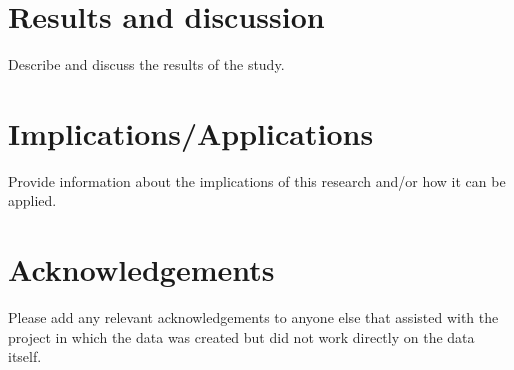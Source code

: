 \documentclass{article}
\begin{document}
\section{Results and discussion}
Describe and discuss the results of the study.

\section{Implications/Applications}
Provide information about the implications of this research and/or how it can be applied.

\section*{Acknowledgements}
Please add any relevant acknowledgements to anyone else that assisted with the project in which the data was created but did not work directly on the data itself.




\end{document}
